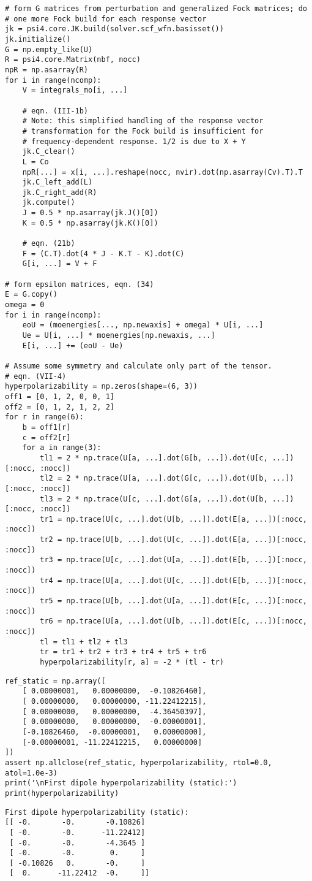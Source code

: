 \begin{verbatim}
# form G matrices from perturbation and generalized Fock matrices; do
# one more Fock build for each response vector
jk = psi4.core.JK.build(solver.scf_wfn.basisset())
jk.initialize()
G = np.empty_like(U)
R = psi4.core.Matrix(nbf, nocc)
npR = np.asarray(R)
for i in range(ncomp):
    V = integrals_mo[i, ...]

    # eqn. (III-1b)
    # Note: this simplified handling of the response vector
    # transformation for the Fock build is insufficient for
    # frequency-dependent response. 1/2 is due to X + Y
    jk.C_clear()
    L = Co
    npR[...] = x[i, ...].reshape(nocc, nvir).dot(np.asarray(Cv).T).T
    jk.C_left_add(L)
    jk.C_right_add(R)
    jk.compute()
    J = 0.5 * np.asarray(jk.J()[0])
    K = 0.5 * np.asarray(jk.K()[0])

    # eqn. (21b)
    F = (C.T).dot(4 * J - K.T - K).dot(C)
    G[i, ...] = V + F

# form epsilon matrices, eqn. (34)
E = G.copy()
omega = 0
for i in range(ncomp):
    eoU = (moenergies[..., np.newaxis] + omega) * U[i, ...]
    Ue = U[i, ...] * moenergies[np.newaxis, ...]
    E[i, ...] += (eoU - Ue)

# Assume some symmetry and calculate only part of the tensor.
# eqn. (VII-4)
hyperpolarizability = np.zeros(shape=(6, 3))
off1 = [0, 1, 2, 0, 0, 1]
off2 = [0, 1, 2, 1, 2, 2]
for r in range(6):
    b = off1[r]
    c = off2[r]
    for a in range(3):
        tl1 = 2 * np.trace(U[a, ...].dot(G[b, ...]).dot(U[c, ...])[:nocc, :nocc])
        tl2 = 2 * np.trace(U[a, ...].dot(G[c, ...]).dot(U[b, ...])[:nocc, :nocc])
        tl3 = 2 * np.trace(U[c, ...].dot(G[a, ...]).dot(U[b, ...])[:nocc, :nocc])
        tr1 = np.trace(U[c, ...].dot(U[b, ...]).dot(E[a, ...])[:nocc, :nocc])
        tr2 = np.trace(U[b, ...].dot(U[c, ...]).dot(E[a, ...])[:nocc, :nocc])
        tr3 = np.trace(U[c, ...].dot(U[a, ...]).dot(E[b, ...])[:nocc, :nocc])
        tr4 = np.trace(U[a, ...].dot(U[c, ...]).dot(E[b, ...])[:nocc, :nocc])
        tr5 = np.trace(U[b, ...].dot(U[a, ...]).dot(E[c, ...])[:nocc, :nocc])
        tr6 = np.trace(U[a, ...].dot(U[b, ...]).dot(E[c, ...])[:nocc, :nocc])
        tl = tl1 + tl2 + tl3
        tr = tr1 + tr2 + tr3 + tr4 + tr5 + tr6
        hyperpolarizability[r, a] = -2 * (tl - tr)
\end{verbatim}
\begin{verbatim}
ref_static = np.array([
    [ 0.00000001,   0.00000000,  -0.10826460],
    [ 0.00000000,   0.00000000, -11.22412215],
    [ 0.00000000,   0.00000000,  -4.36450397],
    [ 0.00000000,   0.00000000,  -0.00000001],
    [-0.10826460,  -0.00000001,   0.00000000],
    [-0.00000001, -11.22412215,   0.00000000]
])
assert np.allclose(ref_static, hyperpolarizability, rtol=0.0, atol=1.0e-3)
print('\nFirst dipole hyperpolarizability (static):')
print(hyperpolarizability)
\end{verbatim}
\begin{verbatim}
First dipole hyperpolarizability (static):
[[ -0.       -0.       -0.10826]
 [ -0.       -0.      -11.22412]
 [ -0.       -0.       -4.3645 ]
 [ -0.       -0.        0.     ]
 [ -0.10826   0.       -0.     ]
 [  0.      -11.22412  -0.     ]]
\end{verbatim}

